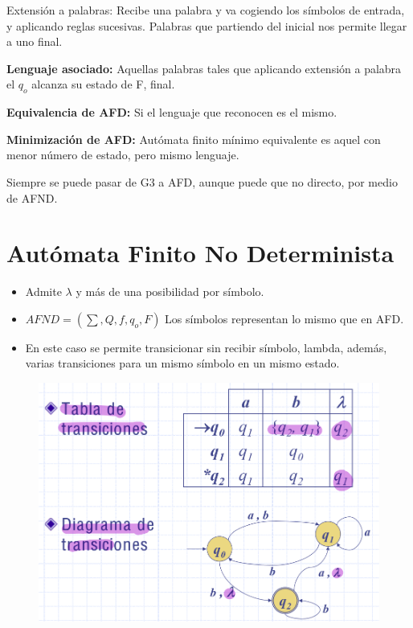 \documentclass[12pt, twoside, openright]{report} %
\begin{document}
Extensión a palabras: Recibe una palabra y va cogiendo los símbolos de
entrada, y aplicando reglas sucesivas. Palabras que partiendo del
inicial nos permite llegar a uno final.

\textbf{Lenguaje asociado:} Aquellas palabras tales que aplicando
extensión a palabra el \(q_o\) alcanza su estado de F, final.

\textbf{Equivalencia de AFD:} Si el lenguaje que reconocen es el mismo.

\textbf{Minimización de AFD:} Autómata finito mínimo equivalente es
aquel con menor número de estado, pero mismo lenguaje.

Siempre se puede pasar de G3 a AFD, aunque puede que no directo, por
medio de AFND.


\section{Autómata Finito No Determinista}

\begin{itemize}
\item
  Admite \(\lambda\) y más de una posibilidad por símbolo.
\item
  \(AFND=( \sum, Q, f, q_o, F)\) Los símbolos representan lo mismo que
  en AFD.
\item
  En este caso se permite transicionar sin recibir símbolo, lambda,
  además, varias transiciones para un mismo símbolo en un mismo estado.
\end{itemize}

\begin{figure}[H]
	{\includegraphics[scale=.4]{Untitled 4.png}}
\end{figure}
\end{document}
